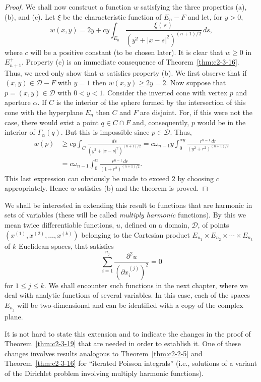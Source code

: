 \begin{proof}
We shall now construct a function $w$ satisfying the three properties (a), (b), and (c). Let $\xi$ be the characteristic function of $E_n - F$ and let, for $y > 0$,
\[
w(x, y) = 2y + cy \int_{E_n} \frac{\xi(s)}{(y^2 + |x - s|^2)^{(n+1)/2}}\,ds,
\]
where $c$ will be a positive constant (to be chosen later). It is clear that $w \geq 0$ in $E_{n+1}^+$. Property (c) is an immediate consequence of Theorem~\ref{thm:c2-3-16}. Thus, we need only show that $w$ satisfies property (b). We first observe that if $(x, y) \in \mathcal{D} - F$ with $y = 1$ then $w(x, y) \geq 2y = 2$. Now suppose that $p = (x, y) \in \mathcal{D}$ with $0 < y < 1$. Consider the inverted cone with vertex $p$ and aperture $\alpha$. If $C$ is the interior of the sphere formed by the intersection of this cone with the hyperplane $E_n$ then $C$ and $F$ are disjoint. For, if this were not the case, there would exist a point $q \in C \cap F$ and, consequently, $p$ would be in the interior of $\Gamma_\alpha(q)$. But this is impossible since $p \in \mathcal{D}$. Thus,
\[
\begin{aligned}
w(p) &\geq cy \int_C \frac{ds}{(y^2 + |x - s|^2)^{(n+1)/2}} = c\omega_{n-1} y \int_0^{\alpha y} \frac{r^{n-1}\,dr}{(y^2 + r^2)^{(n+1)/2}} \\
&= c\omega_{n-1} \int_0^\alpha \frac{r^{n-1}\,dr}{(1 + r^2)^{(n+1)/2}}.
\end{aligned}
\]
This last expression can obviously be made to exceed $2$ by choosing $c$ appropriately. Hence $w$ satisfies (b) and the theorem is proved.
\end{proof}

We shall be interested in extending this result to functions that are harmonic in sets of variables (these will be called \emph{multiply harmonic} functions). By this we mean twice differentiable functions, $u$, defined on a domain, $\mathcal{D}$, of points $(x^{(1)}, x^{(2)}, \dots, x^{(k)})$ belonging to the Cartesian product $E_{n_1} \times E_{n_2} \times \cdots \times E_{n_k}$ of $k$ Euclidean spaces, that satisfies
\[
\sum_{i=1}^{n_j} \frac{\partial^2 u}{(\partial x_i^{(j)})^2} = 0
\]
for $1 \leq j \leq k$. We shall encounter such functions in the next chapter, where we deal with analytic functions of several variables. In this case, each of the spaces $E_{n_j}$ will be two-dimensional and can be identified with a copy of the complex plane.

It is not hard to state this extension and to indicate the changes in the proof of Theorem~\ref{thm:c2-3-19} that are needed in order to establish it. One of these changes involves results analogous to Theorem~\ref{thm:c2-2-5} and Theorem~\ref{thm:c2-3-16} for ``iterated Poisson integrals'' (i.e., solutions of a variant of the Dirichlet problem involving multiply harmonic functions).


